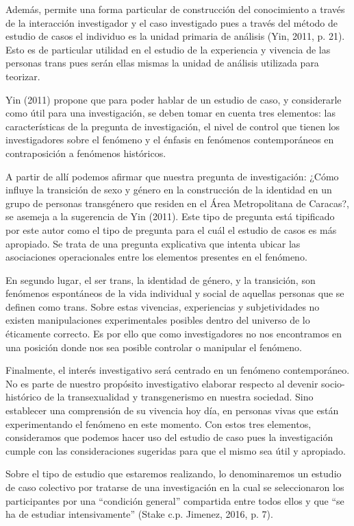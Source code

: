 Además, permite una forma particular de construcción del conocimiento a través
de la interacción investigador y el caso investigado pues a través del método de
estudio de casos el individuo es la unidad primaria de análisis (Yin, 2011, p.
21).
Esto es de particular utilidad en el estudio de la experiencia y vivencia de las
personas trans pues serán ellas mismas la unidad de análisis utilizada para
teorizar.

Yin (2011) propone que para poder hablar de un estudio de caso, y considerarle
como útil para una investigación, se deben tomar en cuenta tres elementos: las
características de la pregunta de investigación, el nivel de control que tienen
los investigadores sobre el fenómeno y el énfasis en fenómenos contemporáneos en
contraposición a fenómenos históricos.

A partir de allí podemos afirmar que nuestra pregunta de investigación: ¿Cómo
influye la transición de sexo y género en la construcción de la identidad en un
grupo de personas transgénero que residen en el Área Metropolitana de  Caracas?,
se asemeja a la sugerencia de Yin (2011).
Este tipo de pregunta está tipificado por este autor como el tipo de pregunta
para el cuál el estudio de casos es más apropiado.
Se trata de una pregunta explicativa que intenta ubicar las asociaciones
operacionales entre los elementos presentes en el fenómeno.

En segundo lugar, el ser trans, la identidad de género, y la transición, son
fenómenos espontáneos de la vida individual y social de aquellas personas que se
definen como trans.
Sobre estas vivencias, experiencias y subjetividades no existen manipulaciones
experimentales posibles dentro del universo de lo éticamente correcto.
Es por ello que como investigadores no nos encontramos en una posición donde nos
sea posible controlar o manipular el fenómeno.

Finalmente, el interés investigativo será centrado en un fenómeno contemporáneo.
No es parte de nuestro propósito investigativo elaborar respecto al devenir
socio-histórico de la transexualidad y transgenerismo en nuestra sociedad.
Sino establecer una comprensión de su vivencia hoy día, en personas vivas que
están experimentando el fenómeno en este momento.
Con estos tres elementos, consideramos que podemos hacer uso del estudio de caso
pues la investigación cumple con las consideraciones sugeridas para que el mismo
sea útil y apropiado.

Sobre el tipo de estudio que estaremos realizando, lo denominaremos un estudio
de caso colectivo por tratarse de una investigación en la cual se seleccionaron
los participantes por una “condición general” compartida entre todos ellos y que
“se ha de estudiar intensivamente” (Stake c.p. Jimenez, 2016, p. 7).

